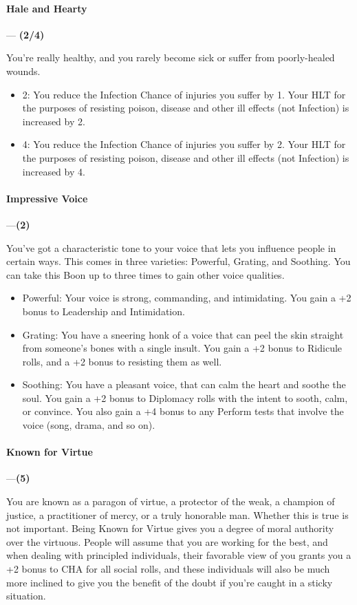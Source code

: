 \documentclass[oneside,11pt,english]{book}
\begin{document}
\paragraph{\label{boon:Hale and Hearty}Hale and Hearty}---\quad\textbf{ (2/4) }\par
You're really healthy, and you rarely become sick or suffer from poorly-healed wounds. 

\begin{itemize}
\item 2: You reduce the Infection Chance of injuries you suffer by 1. Your HLT for the purposes of resisting 
  poison, disease and other ill effects (not Infection) is increased by 2. 
\item 4: You reduce the Infection Chance of injuries you suffer by 2. Your HLT for the purposes of resisting 
  poison, disease and other ill effects (not Infection) is increased by 4. 
\end{itemize}
\paragraph{\label{boon:Impressive Voice}Impressive Voice}---\quad\textbf{(2)}\par
You've got a characteristic tone to your voice that lets you influence people in certain ways. This comes 
in three varieties: Powerful, Grating, and Soothing. You can take this Boon up to three times to gain other 
voice qualities. 

\begin{itemize}
\item Powerful: Your voice is strong, commanding, and intimidating. You gain a +2 bonus to Leadership and 
  Intimidation. 
\item Grating: You have a sneering honk of a voice that can peel the skin straight from someone's bones with a 
  single insult. You gain a +2 bonus to Ridicule rolls, and a +2 bonus to resisting them as well. 
\item Soothing: You have a pleasant voice, that can calm the heart and soothe the soul. You gain a +2 bonus to 
  Diplomacy rolls with the intent to sooth, calm, or convince. You also gain a +4 bonus to any Perform 
  tests that involve the voice (song, drama, and so on). 
\end{itemize}
\paragraph{\label{boon:Known for Virtue}Known for Virtue}---\quad\textbf{(5)}\par
You are known as a paragon of virtue, a protector of the weak, a champion of justice, a practitioner of 
mercy, or a truly honorable man. Whether this is true is not important. Being Known for Virtue gives you 
a degree of moral authority over the virtuous. People will assume that you are working for the best, and 
when dealing with principled individuals, their favorable view of you grants you a +2 bonus to CHA for 
all social rolls, and these individuals will also be much more inclined to give you the benefit of the doubt 
if you're caught in a sticky situation. 
\end{document}
